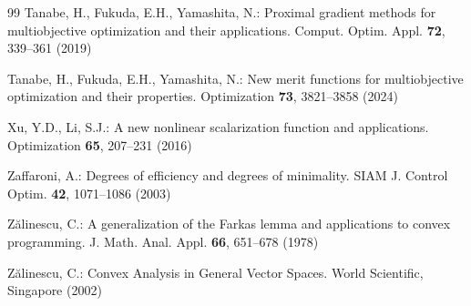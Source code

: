 \documentclass[11pt]{article}
\begin{document}
\begin{thebibliography}{99}
 	 Tanabe, H., Fukuda, E.H., Yamashita, N.: Proximal gradient methods for multiobjective optimization and their applications. Comput. Optim. Appl. \textbf{72}, 339–361 (2019)
 	
 	 Tanabe, H., Fukuda, E.H., Yamashita, N.: New merit functions for multiobjective optimization and their properties. Optimization \textbf{73}, 3821–3858 (2024)
 	
 	 Xu, Y.D., Li, S.J.: A new nonlinear scalarization function and applications. Optimization \textbf{65}, 207–231 (2016)
 	
 	 Zaffaroni, A.: Degrees of efficiency and degrees of minimality. SIAM J. Control Optim. \textbf{42}, 1071–1086 (2003)
 	
 	 Zălinescu, C.: A generalization of the Farkas lemma and applications to convex programming. J. Math. Anal. Appl. \textbf{66}, 651–678 (1978)
 	
 	 Zălinescu, C.: Convex Analysis in General Vector Spaces. World Scientific, Singapore (2002)
 	
 \end{thebibliography}
\end{document}
